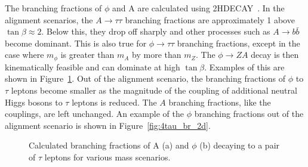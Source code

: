 The branching fractions of $\phi$ and A are calculated using \textsc{2HDECAY}~\cite{Krause:2018wmo}.
In the alignment scenarios, the $A\rightarrow\tau\tau$ branching fractions are approximately 1 above $\tan\beta \approx 2$. 
Below this, they drop off sharply and other processes such as $A\rightarrow b\bar{b}$ become dominant.
This is also true for $\phi\rightarrow\tau\tau$ branching fractions, except in the case where $m_\phi$ is greater than $m_A$ by more than $m_Z$. 
The $\phi\rightarrow ZA$ decay is then kinematically feasible and can dominate at high $\tan\beta$.
Examples of this are shown in Figure~\ref{fig:4tau_br_1d}.
Out of the alignment scenario, the branching fractions of $\phi$ to $\tau$ leptons become smaller as the magnitude of the coupling of additional neutral Higgs bosons to $\tau$ leptons is reduced. 
The $A$ branching fractions, like the couplings, are left unchanged.
An example of the $\phi$ branching fractions out of the alignment scenario is shown in Figure~\ref{fig:4tau_br_2d}.

\begin{figure}[!hbtp]
\centering
\caption[Plots of the branching fractions $\phi$ and A to pairs of $\tau$ leptons in the alignment scenario.]{Calculated branching fractions of A (a) and $\phi$ (b) decaying to a pair of $\tau$ leptons for various mass scenarios.}
\label{fig:4tau_br_1d}
\end{figure}

